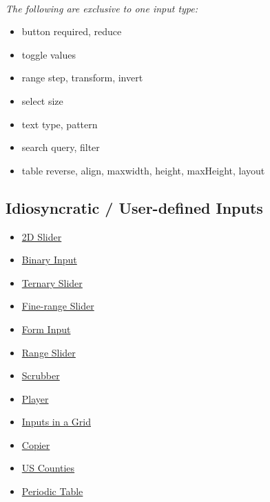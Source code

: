 \addtolength{\tabcolsep}{3pt}
\\
\textit{The following are exclusive to one input type:}
\begin{itemize}
    \item button \tabto{15mm} required, reduce
    \item toggle \tabto{15mm} values
    \item range \tabto{15mm} step, transform, invert
    \item select \tabto{15mm} size
    \item text \tabto{15mm} type, pattern
    \item search \tabto{15mm} query, filter
    \item table \tabto{15mm} reverse, align, maxwidth, height, maxHeight, layout
\end{itemize}


\subsection*{Idiosyncratic / User-defined Inputs}



\begin{minipage}{3cm}
\begin{itemize}
    \item \href{https://observablehq.com/@mootari/2d-slider}{2D Slider}
    \item \href{https://observablehq.com/@rreusser/binary-input}{Binary Input}
    \item \href{https://observablehq.com/@yurivish/ternary-slider}{Ternary Slider}
    \item \href{https://observablehq.com/@rreusser/fine-range}{Fine-range Slider}
    \item \href{https://observablehq.com/@mbostock/form-input}{Form Input}
    \item \href{https://observablehq.com/@mootari/range-slider}{Range Slider}
\end{itemize}
\end{minipage}\begin{minipage}{3cm}
\begin{itemize}
    \item \href{https://observablehq.com/@mbostock/scrubber}{Scrubber}
    \item \href{https://observablehq.com/@oscar6echo/player}{Player}
    \item \href{https://observablehq.com/@bumbeishvili/input-groups}{Inputs in a Grid}
    \item \href{https://observablehq.com/@mbostock/copier}{Copier}
    \item \href{https://observablehq.com/@awhitty/fips-county-code-brush}{US Counties}
    \item \href{https://observablehq.com/@bobkerns/elements-input}{Periodic Table}
\end{itemize}
\end{minipage}